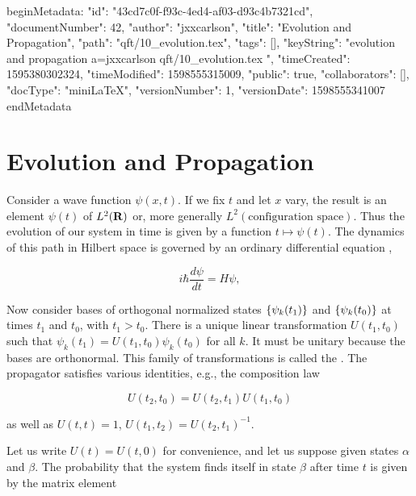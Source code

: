 beginMetadata:
{
    "id": "43cd7c0f-f93c-4ed4-af03-d93c4b7321cd",
    "documentNumber": 42,
    "author": "jxxcarlson",
    "title": "Evolution and Propagation",
    "path": "qft/10_evolution.tex",
    "tags": [],
    "keyString": "evolution and propagation a=jxxcarlson qft/10_evolution.tex ",
    "timeCreated": 1595380302324,
    "timeModified": 1598555315009,
    "public": true,
    "collaborators": [],
    "docType": "miniLaTeX",
    "versionNumber": 1,
    "versionDate": 1598555341007
}
endMetadata
\begin{mathmacro}
\newcommand{\bra}[0]{\langle}
\newcommand{\ket}[0]{\rangle}
\newcommand{\caF}[0]{\mathcal{F}}
\newcommand{\bbR}[0]{\bf{R}}
\newcommand{\set}[1]{\{#1\}}
\end{mathmacro}

\setcounter{section}{10}

\section{Evolution and Propagation}

\innertableofcontents

Consider a wave function $\psi(x,t)$.  If we fix $t$ and let $x$ vary, the result is an element $\psi(t)$ of $L^2(\bbR)$ or, more generally $L^2(\text{configuration space})$.  Thus the evolution of our system in time is given by a function $t \mapsto \psi(t)$.  The dynamics of this path in Hilbert space is governed by an ordinary differential equation ,

\begin{equation}
\label{schreq}
i\hbar\frac{d\psi}{dt} = H\psi,
\end{equation}

Now consider bases of orthogonal normalized states $\set{\psi_k(t_1)}$ and $\set{\psi_k(t_0)}$ at times $t_1$ and $t_0$, with $t_1 > t_0$.  There is a unique linear transformation $U(t_1,t_0)$ such that $\psi_k(t_1) = U(t_1,t_0)\psi_k(t_0)$ for all $k$.  It must be unitary because the bases are orthonormal.  This family of transformations is called the .  The propagator satisfies various identities, e.g., the composition law

\begin{equation}
U(t_2, t_0) = U(t_2, t_1)U(t_1, t_0)
\end{equation}

as well as $U(t,t) = 1$, $U(t_1,t_2) = U(t_2,t_1)^{-1}$. 

Let us write $U(t) = U(t,0)$ for convenience, and let us suppose given states $\alpha$ and $\beta$.  The probability that the system finds itself in state $\beta$ after time $t$ is given by the matrix element

